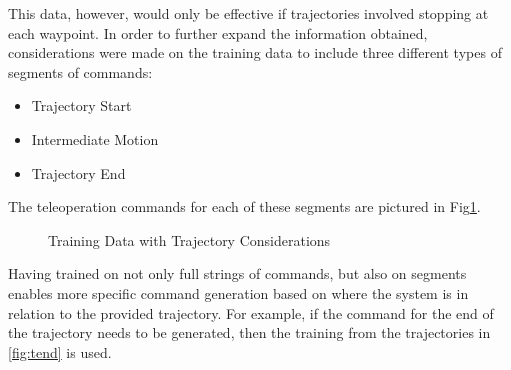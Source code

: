 \documentclass[letterpaper, 10 pt, conference]{ieeeconf}  %
\begin{document}
This data, however, would only be effective if trajectories involved stopping at each waypoint. In order to further expand the information obtained, considerations were made on the training data to include three different types of segments of commands:

\begin{itemize}
\item Trajectory Start
\item Intermediate Motion
\item Trajectory End
\end{itemize}

The teleoperation commands for each of these segments are pictured in Fig\ref{fig:trainelab}.

\begin{figure}[h]
	\centering
	\caption{Training Data with Trajectory Considerations}
	\label{fig:trainelab}
\end{figure}

Having trained on not only full strings of commands, but also on segments enables more specific command generation based on where the system is in relation to the provided trajectory. For example, if the command for the end of the trajectory needs to be generated, then the training from the trajectories in \ref{fig:tend} is used.
\end{document}
